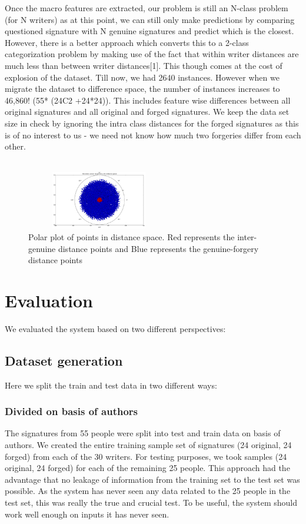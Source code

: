 \documentclass{article}
\begin{document}
Once the macro features are extracted, our problem is still an N-class problem (for N writers) as at this point, we can still only make predictions by comparing questioned signature with N  genuine signatures and predict which is the closest. However, there is a better approach which converts this to a 2-class categorization problem by making use of the fact that within writer distances are much less than between writer distances[1]. This though comes at the cost of explosion of the dataset. Till now, we had 2640 instances. However when we migrate the dataset to difference space, the number of instances increases to 46,860! (55* (24C2 +24*24)). This includes feature wise differences between all original signatures and all original and forged signatures. We keep the data set size in check by ignoring the intra class distances for the forged signatures as this is of no interest to us - we need not know how much two forgeries differ from each other.
\\
\\
\begin{figure}[ht]
	\begin{center}
        		\includegraphics[width=2.5in, height=1in]{polarfigure.png}
       		 \caption{Polar plot of points in distance space. Red represents the inter-genuine distance points and Blue represents the genuine-forgery distance points}
	\end{center}
\end{figure}

\section{Evaluation}

We evaluated the system based on two different perspectives:

\subsection{Dataset generation}
Here we split the train and test data in two different ways:

\subsubsection{Divided on basis of authors}
The signatures from 55 people were split into test and train data on basis of authors. We created the entire training sample set of signatures (24 original, 24 forged) from each of the 30 writers. For testing purposes, we took samples (24 original, 24 forged) for each of the remaining 25 people. This approach had the advantage that no leakage of information from the training set to the test set was possible. As the system has never seen any data related to the 25 people in the test set, this was really the true and crucial test. To be useful, the system should work well enough on inputs it has never seen.
\end{document}
